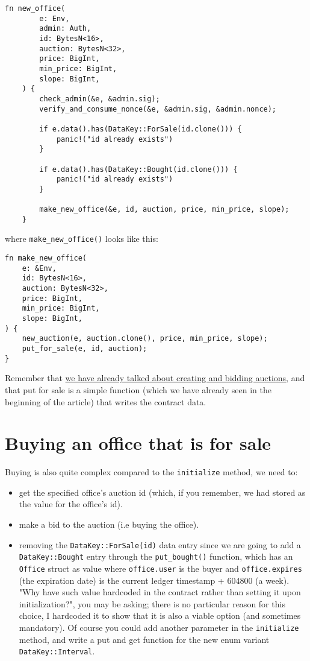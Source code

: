 \documentclass[10pt]{article}
\begin{document}
\begin{verbatim}
fn new_office(
        e: Env,
        admin: Auth,
        id: BytesN<16>,
        auction: BytesN<32>,
        price: BigInt,
        min_price: BigInt,
        slope: BigInt,
    ) {
        check_admin(&e, &admin.sig);
        verify_and_consume_nonce(&e, &admin.sig, &admin.nonce);

        if e.data().has(DataKey::ForSale(id.clone())) {
            panic!("id already exists")
        }

        if e.data().has(DataKey::Bought(id.clone())) {
            panic!("id already exists")
        }

        make_new_office(&e, id, auction, price, min_price, slope);
    }
\end{verbatim}

where \texttt{make\_new\_office()} looks like this:

\begin{verbatim}
fn make_new_office(
    e: &Env,
    id: BytesN<16>,
    auction: BytesN<32>,
    price: BigInt,
    min_price: BigInt,
    slope: BigInt,
) {
    new_auction(e, auction.clone(), price, min_price, slope);
    put_for_sale(e, id, auction);
}
\end{verbatim}

Remember that \href{#interacting-with-the-dutch-auction-contract}{we have already talked about creating and bidding auctions}, and that put for sale is a simple function (which we have already seen in the beginning of the article) that writes the contract data.

\section*{Buying an office that is for sale}
Buying is also quite complex compared to the \texttt{initialize} method, we need to:

\begin{itemize}
  \item get the specified office's auction id (which, if you remember, we had stored as the value for the office's id).
  \item make a bid to the auction (i.e buying the office).
  \item removing the \texttt{DataKey::ForSale(id)} data entry since we are going to add a \texttt{DataKey::Bought} entry through the \texttt{put\_bought()} function, which has an \texttt{Office} struct as value where \texttt{office.user} is the buyer and \texttt{office.expires} (the expiration date) is the current ledger timestamp + 604800 (a week). "Why have such value hardcoded in the contract rather than setting it upon initialization?", you may be asking; there is no particular reason for this choice, I hardcoded it to show that it is also a viable option (and sometimes mandatory). Of course you could add another parameter in the \texttt{initialize} method, and write a put and get function for the new enum variant \texttt{DataKey::Interval}.
\end{itemize}
\end{document}
